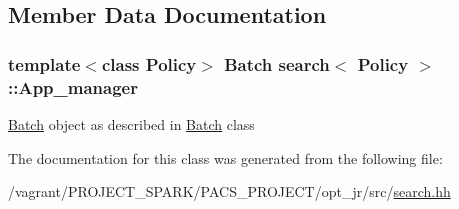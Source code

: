 \subsection{Member Data Documentation}
\hypertarget{classsearch_aa9b7922418788c7febf5aca7af407264}{
\subsubsection[{App\-\_\-manager}]{\setlength{\rightskip}{0pt plus 5cm}template$<$class Policy$>$ {\bf Batch} {\bf search}$<$ Policy $>$\-::App\-\_\-manager\hspace{0.3cm}{\ttfamily [private]}}}\label{classsearch_aa9b7922418788c7febf5aca7af407264}
\hyperlink{classBatch}{Batch} object as described in \hyperlink{classBatch}{Batch} class 

The documentation for this class was generated from the following file\-:\begin{DoxyCompactItemize}
\item 
/vagrant/\-P\-R\-O\-J\-E\-C\-T\-\_\-\-S\-P\-A\-R\-K/\-P\-A\-C\-S\-\_\-\-P\-R\-O\-J\-E\-C\-T/opt\-\_\-jr/src/\hyperlink{search_8hh}{search.\-hh}\end{DoxyCompactItemize}
